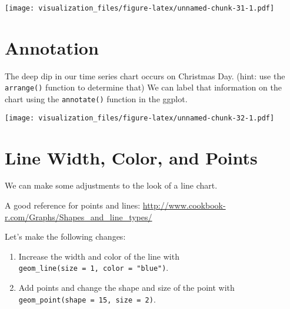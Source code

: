 \documentclass[oneside]{memoir}
\newenvironment{Shaded}{\begin{snugshade}}{\end{snugshade}}
\newcommand{\KeywordTok}[1]{\textcolor[rgb]{0.13,0.29,0.53}{\textbf{#1}}}
\newcommand{\DataTypeTok}[1]{\textcolor[rgb]{0.13,0.29,0.53}{#1}}
\newcommand{\DecValTok}[1]{\textcolor[rgb]{0.00,0.00,0.81}{#1}}
\newcommand{\StringTok}[1]{\textcolor[rgb]{0.31,0.60,0.02}{#1}}
\newcommand{\OperatorTok}[1]{\textcolor[rgb]{0.81,0.36,0.00}{\textbf{#1}}}
\newcommand{\NormalTok}[1]{#1}
\theoremstyle{definition}
\theoremstyle{definition}
\theoremstyle{definition}
\theoremstyle{remark}
\begin{document}
\texttt{[image: visualization\_files/figure-latex/unnamed-chunk-31-1.pdf]}

\section{Annotation}\label{annotation}

The deep dip in our time series chart occurs on Christmas Day. (hint:
use the \texttt{arrange()} function to determine that) We can label that
information on the chart using the \texttt{annotate()} function in the
ggplot.

\begin{Shaded}
\end{Shaded}

\texttt{[image: visualization\_files/figure-latex/unnamed-chunk-32-1.pdf]}

\section{Line Width, Color, and
Points}\label{line-width-color-and-points}

We can make some adjustments to the look of a line chart.

A good reference for points and lines:
\url{http://www.cookbook-r.com/Graphs/Shapes_and_line_types/}

Let's make the following changes:

\begin{enumerate}
\def\labelenumi{\arabic{enumi}.}
\item
  Increase the width and color of the line with
  \texttt{geom\_line(size\ =\ 1,\ color\ =\ "blue")}.
\item
  Add points and change the shape and size of the point with
  \texttt{geom\_point(shape\ =\ 15,\ size\ =\ 2)}.
\end{enumerate}
\end{document}
